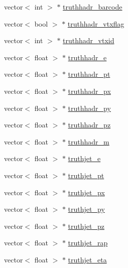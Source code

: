 \begin{DoxyCompactItemize}
vector$<$ int $>$ $\ast$ \hyperlink{classJetAnalysisExample_a0881f308a6fe3952dbcaf92091c1d3a8}{truthhadr\+\_\+barcode}
\item 
vector$<$ bool $>$ $\ast$ \hyperlink{classJetAnalysisExample_a57716b35487749a327eb21eca7735c01}{truthhadr\+\_\+vtxflag}
\item 
vector$<$ int $>$ $\ast$ \hyperlink{classJetAnalysisExample_af6856a6033ff1c16e88b77a51235f2c2}{truthhadr\+\_\+vtxid}
\item 
vector$<$ float $>$ $\ast$ \hyperlink{classJetAnalysisExample_a939e6bf969131262c5eb69457f455357}{truthhadr\+\_\+e}
\item 
vector$<$ float $>$ $\ast$ \hyperlink{classJetAnalysisExample_ae776d55ae8269db1271e7dda6a07fcbd}{truthhadr\+\_\+pt}
\item 
vector$<$ float $>$ $\ast$ \hyperlink{classJetAnalysisExample_a8c861c0651377007e17fb5a9e20ae997}{truthhadr\+\_\+px}
\item 
vector$<$ float $>$ $\ast$ \hyperlink{classJetAnalysisExample_a911f083a82fee58e964c3f941146e7c8}{truthhadr\+\_\+py}
\item 
vector$<$ float $>$ $\ast$ \hyperlink{classJetAnalysisExample_a4c81c2e9be9547402ea6925aa0c00eb2}{truthhadr\+\_\+pz}
\item 
vector$<$ float $>$ $\ast$ \hyperlink{classJetAnalysisExample_a9fc9758d4971ca339b1e16ca5e9523d2}{truthhadr\+\_\+m}
\item 
vector$<$ float $>$ $\ast$ \hyperlink{classJetAnalysisExample_aaefeb1cccdb0fa579cd961d976ddcba4}{truthjet\+\_\+e}
\item 
vector$<$ float $>$ $\ast$ \hyperlink{classJetAnalysisExample_a7e460256377946cccb0f789222a04503}{truthjet\+\_\+pt}
\item 
vector$<$ float $>$ $\ast$ \hyperlink{classJetAnalysisExample_a04cb4f5ec0906ec08f1ef8e6c4b96458}{truthjet\+\_\+px}
\item 
vector$<$ float $>$ $\ast$ \hyperlink{classJetAnalysisExample_a9cd3d436179a413d396f99d8a877d697}{truthjet\+\_\+py}
\item 
vector$<$ float $>$ $\ast$ \hyperlink{classJetAnalysisExample_a15e88712fc9aa587282eb03d15027901}{truthjet\+\_\+pz}
\item 
vector$<$ float $>$ $\ast$ \hyperlink{classJetAnalysisExample_adc36055028d4305c2b3a5f693dc97fc4}{truthjet\+\_\+rap}
\item 
vector$<$ float $>$ $\ast$ \hyperlink{classJetAnalysisExample_a5fa46520279e8f5625825bb9b8a0775d}{truthjet\+\_\+eta}
\item 

\end{DoxyCompactItemize}
